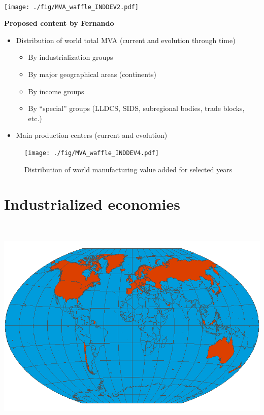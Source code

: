 \documentclass[
  openany, nofonts]{tufte-book}
\providecommand{\tightlist}{%
  \setlength{\itemsep}{0pt}\setlength{\parskip}{0pt}}
\begin{document}
~

\begin{marginfigure}
\texttt{[image: ./fig/MVA\_waffle\_INDDEV2.pdf]} \end{marginfigure}

\vspace*{-1.5cm}

\textbf{Proposed content by Fernando}

\begin{itemize}
\tightlist
\item
  Distribution of world total MVA (current and evolution through time)

  \begin{itemize}
  \tightlist
  \item
    By industrialization groups
  \item
    By major geographical areas (continents)
  \item
    By income groups
  \item
    By ``special'' groups (LLDCS, SIDS, subregional bodies, trade blocks, etc.)
  \end{itemize}
\item
  Main production centers (current and evolution)
\end{itemize}

\vspace*{\fill}

\begin{figure}
\texttt{[image: ./fig/MVA\_waffle\_INDDEV4.pdf]} \caption[Distribution of world manufacturing value added for selected years]{Distribution of world manufacturing value added for selected years}\label{fig:c03-inddev4-waffle}
\end{figure}

\pagebreak

\hypertarget{industrialized-economies}{%
\section{Industrialized economies}\label{industrialized-economies}}

~

\begin{marginfigure}
\includegraphics[width=1\linewidth]{./img/GROUP_INDwintri.png} \end{marginfigure}
\end{document}
